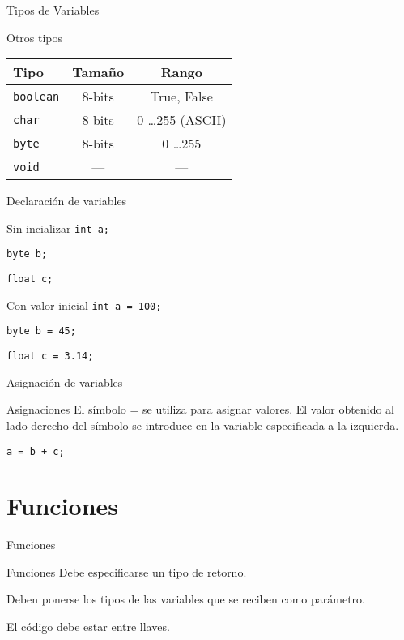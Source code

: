 \documentclass[handout,xcolor=dvipsnames]{beamer}
\newcommand{\pageframe}[1]{\frame{\begin{center}{ \Huge #1 }\end{center}}}
\begin{document}
\begin{frame}{Tipos de Variables}
\begin{block}{Otros tipos}
\begin{center}
 \begin{tabular}{lcc}\hline
 	Tipo	& 	 Tamaño & Rango \\\hline\hline
{\tt boolean} &  8-bits & True, False \\\hline
{\tt char} &  8-bits & 0 \ldots 255 (ASCII) \\\hline
{\tt byte} &  8-bits & 0 \ldots 255 \\\hline
{\tt void} & --- & --- \\\hline
 \end{tabular}
\end{center}
\end{block}
\end{frame}

\begin{frame}{Declaración de variables}
\begin{block}{Sin incializar}
{\tt int a;}

{\tt byte b;}

{\tt float c;}
\end{block}
\begin{block}{Con valor inicial}
{\tt int a = 100;}

{\tt byte b = 45;}

{\tt float c = 3.14;}
\end{block}
\end{frame}

\begin{frame}{Asignación de variables}
  \begin{block}{Asignaciones}
  	El símbolo = se utiliza para asignar valores. El valor obtenido al lado derecho del símbolo se introduce en la variable especificada a la izquierda.
  \end{block}
  \begin{block}
	{\tt a = b + c;}
  \end{block}
\end{frame}

\section{Funciones}

\pageframe{Funciones}


\begin{frame}{Funciones}
  \begin{block}{Funciones}
    Debe especificarse un tipo de retorno.
    
    Deben ponerse los tipos de las variables que se reciben como parámetro.
    
    El código debe estar entre llaves.
  \end{block}
\end{frame}
\end{document}

